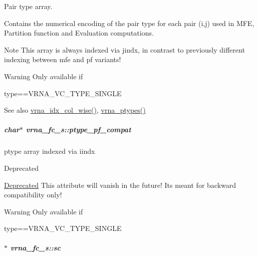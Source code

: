 Pair type array. 

Contains the numerical encoding of the pair type for each pair (i,j) used in M\+FE, Partition function and Evaluation computations. \begin{DoxyNote}{Note}
This array is always indexed via jindx, in contrast to previously different indexing between mfe and pf variants! 
\end{DoxyNote}
\begin{DoxyWarning}{Warning}
Only available if\begin{DoxyVerb}type==VRNA_VC_TYPE_SINGLE \end{DoxyVerb}
 
\end{DoxyWarning}
\begin{DoxySeeAlso}{See also}
\hyperlink{group__utils_ga89ebc69c52fa0c78c9e1974b0017746b}{vrna\+\_\+idx\+\_\+col\+\_\+wise()}, \hyperlink{alphabet_8h_a51a9e86a5f731f5f2f5584ee67cee4a8}{vrna\+\_\+ptypes()} 
\end{DoxySeeAlso}
\subparagraph[{\texorpdfstring{ptype\+\_\+pf\+\_\+compat}{ptype_pf_compat}}]{\setlength{\rightskip}{0pt plus 5cm}char$\ast$ vrna\+\_\+fc\+\_\+s\+::ptype\+\_\+pf\+\_\+compat}\hypertarget{group__fold__compound_a7fe1235ce3d41287695f1ae1e283e8fc}{}\label{group__fold__compound_a7fe1235ce3d41287695f1ae1e283e8fc}


ptype array indexed via iindx 

\begin{DoxyRefDesc}{Deprecated}
\item[\hyperlink{deprecated__deprecated000051}{Deprecated}]This attribute will vanish in the future! It\textquotesingle{}s meant for backward compatibility only! \end{DoxyRefDesc}
\begin{DoxyWarning}{Warning}
Only available if\begin{DoxyVerb}type==VRNA_VC_TYPE_SINGLE \end{DoxyVerb}
 
\end{DoxyWarning}
\subparagraph[{\texorpdfstring{sc}{sc}}]{$\ast$ vrna\+\_\+fc\+\_\+s\+::sc}\hypertarget{group__fold__compound_ac7089e90460ad3990a308808c8044c9f}{}\label{group__fold__compound_ac7089e90460ad3990a308808c8044c9f}


